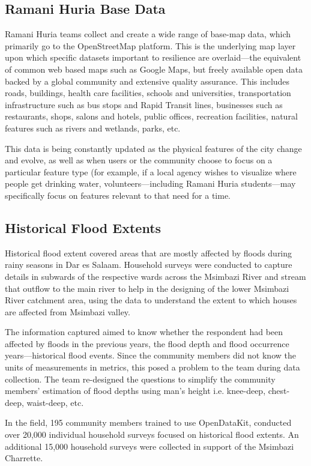 \documentclass[a4paper,12pt,twoside]{article}
\begin{document}
\subsection{Ramani Huria Base Data}
Ramani Huria teams collect and create a wide range of base-map data, which primarily go to the OpenStreetMap platform. This is the underlying map layer upon which specific datasets important to resilience are overlaid—the equivalent of common web based maps such as Google Maps, but freely available open data backed by a global community and extensive quality assurance. This includes roads, buildings, health care facilities, schools and universities, transportation infrastructure such as bus stops and Rapid Transit lines, businesses such as restaurants, shops, salons and hotels, public offices, recreation facilities, natural features such as rivers and wetlands, parks, etc. 

This data is being constantly updated as the physical features of the city change and evolve, as well as when users or the community choose to focus on a particular feature type (for example, if a local agency wishes to visualize where people get drinking water, volunteers—including Ramani Huria students—may specifically focus on features relevant to that need for a time.

\subsection{Historical Flood Extents}

Historical flood extent covered areas that are mostly affected by floods during rainy seasons in Dar es Salaam. Household surveys were conducted to capture details in subwards of the respective wards across the Msimbazi River and stream that outflow to the main river to help in the designing of the lower Msimbazi River catchment area, using the data to understand the extent to which houses are affected from Msimbazi valley.

The information captured aimed to know whether the respondent had been affected by floods in the previous years, the flood depth and flood occurrence years---historical flood events. Since the community members did not know the units of measurements in metrics, this posed a problem to the team during data collection. The team re-designed the questions to simplify the community members’ estimation of flood depths using man’s height i.e. knee-deep, chest-deep, waist-deep, etc.

In the field, 195 community members trained to use OpenDataKit, conducted over 20,000 individual household surveys focused on historical flood extents. An additional 15,000 household surveys were collected in support of the Msimbazi Charrette. 
\end{document}
